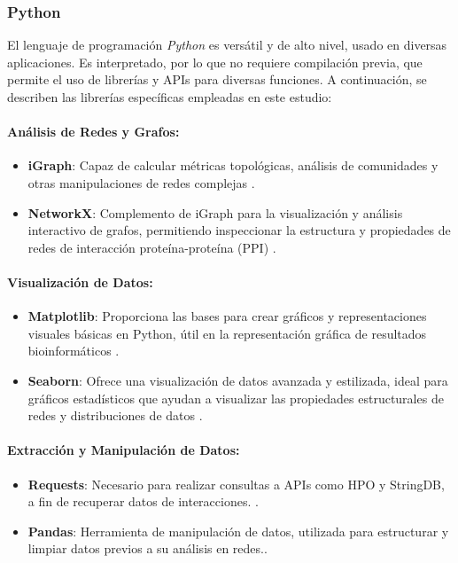 \subsubsection{Python}
El lenguaje de programación \textit{Python} es versátil y de alto nivel, usado en diversas aplicaciones.  Es interpretado, por lo que no requiere compilación previa, que permite el uso de librerías y APIs para diversas funciones. A continuación, se describen las librerías específicas empleadas en este estudio:

\paragraph{Análisis de Redes y Grafos:}
\begin{itemize}
	\item \textbf{iGraph}: Capaz de calcular métricas topológicas, análisis de comunidades y otras manipulaciones de redes complejas \cite{igraph2006}.
	\item \textbf{NetworkX}: Complemento de iGraph para la visualización y análisis interactivo de grafos, permitiendo inspeccionar la estructura y propiedades de redes de interacción proteína-proteína (PPI) \cite{hagberg2008}.
\end{itemize}

\paragraph{Visualización de Datos:}
\begin{itemize}
	\item \textbf{Matplotlib}: Proporciona las bases para crear gráficos y representaciones visuales básicas en Python, útil en la representación gráfica de resultados bioinformáticos \cite{Hunter2007}.
	\item \textbf{Seaborn}: Ofrece una visualización de datos avanzada y estilizada, ideal para gráficos estadísticos que ayudan a visualizar las propiedades estructurales de redes y distribuciones de datos \cite{Waskom2021}.
\end{itemize}

\paragraph{Extracción y Manipulación de Datos:}
\begin{itemize}
	\item \textbf{Requests}: Necesario para realizar consultas a APIs como HPO y StringDB, a fin de recuperar datos de interacciones. \cite{Requests2020}.
	\item \textbf{Pandas}: Herramienta de manipulación de datos, utilizada para estructurar y limpiar datos previos a su análisis en redes.\cite{McKinney2010}.
\end{itemize}




